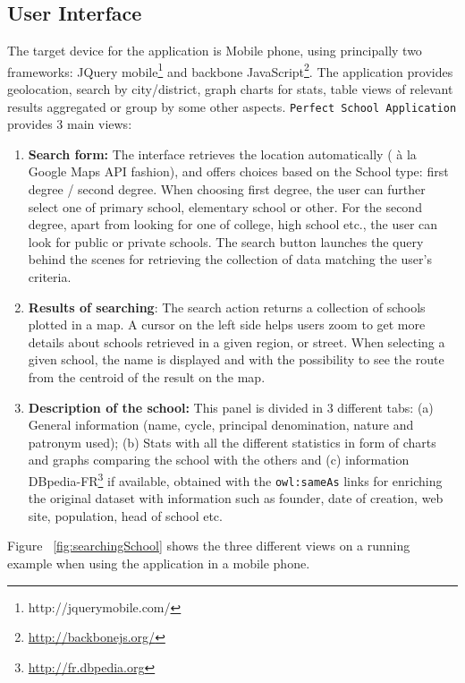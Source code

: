 \subsection{User Interface}
The target device for the application is Mobile phone, using principally two frameworks: JQuery mobile\footnote{http://jquerymobile.com/} and  backbone JavaScript\footnote{\url{http://backbonejs.org/}}.
The application provides geolocation, search by city/district, graph charts for stats, table views of relevant results aggregated or group by some other aspects.
\texttt{Perfect School Application} provides 3 main views:
\begin{enumerate}
\item \textbf{Search form:} The interface retrieves the location automatically ( \`{a} la Google Maps API fashion), and offers choices based on the School type: first degree / second degree. When choosing first degree, the user can further select one of primary school, elementary school or other. For the second degree, apart from looking for one of college, high school etc., the user can look for public or private schools. The search button launches the query behind the scenes for retrieving the collection of data matching the user's criteria.

\item \textbf{Results of searching}: The search action returns a collection of schools plotted in a map. A cursor on the left side helps users zoom to get more details about schools retrieved in a given region, or street. When selecting a given school, the name is displayed and with the possibility to see the route from the centroid of the result on the map.
\item \textbf{Description of the school:} This panel is divided in 3 different tabs: (a) General information (name, cycle, principal denomination, nature and patronym used); (b) Stats with all the different statistics in form of charts and graphs comparing the school with the others and (c) information DBpedia-FR\footnote{\url{http://fr.dbpedia.org}}  if available, obtained with the \texttt{owl:sameAs} links for enriching the original dataset with  information such as founder, date of creation, web site, population, head of school etc.

\end{enumerate}

Figure ~\ref{fig:searchingSchool} shows the three different views on a running example when using the application in a mobile phone.

